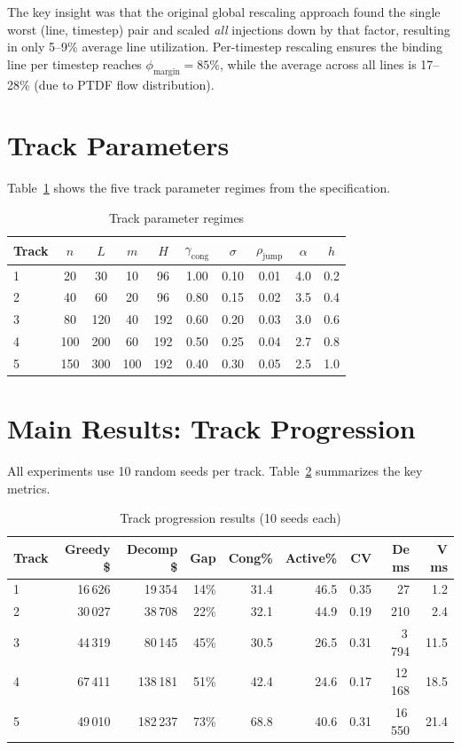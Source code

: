 \documentclass[11pt,a4paper]{article}
\begin{document}
The key insight was that the original global rescaling approach found the single worst (line, timestep) pair and scaled \emph{all} injections down by that factor, resulting in only 5--9\% average line utilization. Per-timestep rescaling ensures the binding line per timestep reaches $\phi_{\mathrm{margin}} = 85\%$, while the average across all lines is 17--28\% (due to PTDF flow distribution).

\section{Track Parameters}

Table~\ref{tab:tracks} shows the five track parameter regimes from the specification.

\begin{table}[h]
\centering
\caption{Track parameter regimes}
\label{tab:tracks}
\begin{tabular}{lccccccccc}
\toprule
\textbf{Track} & $n$ & $L$ & $m$ & $H$ & $\gamma_{\mathrm{cong}}$ & $\sigma$ & $\rho_{\mathrm{jump}}$ & $\alpha$ & $h$ \\
\midrule
1 & 20 & 30 & 10 & 96 & 1.00 & 0.10 & 0.01 & 4.0 & 0.2 \\
2 & 40 & 60 & 20 & 96 & 0.80 & 0.15 & 0.02 & 3.5 & 0.4 \\
3 & 80 & 120 & 40 & 192 & 0.60 & 0.20 & 0.03 & 3.0 & 0.6 \\
4 & 100 & 200 & 60 & 192 & 0.50 & 0.25 & 0.04 & 2.7 & 0.8 \\
5 & 150 & 300 & 100 & 192 & 0.40 & 0.30 & 0.05 & 2.5 & 1.0 \\
\bottomrule
\end{tabular}
\end{table}

\section{Main Results: Track Progression}

All experiments use 10 random seeds per track. Table~\ref{tab:main} summarizes the key metrics.

\begin{table}[h]
\centering
\caption{Track progression results (10 seeds each)}
\label{tab:main}
\begin{tabular}{lrrrrrrrr}
\toprule
\textbf{Track} & \textbf{Greedy \$} & \textbf{Decomp \$} & \textbf{Gap} & \textbf{Cong\%} & \textbf{Active\%} & \textbf{CV} & \textbf{De ms} & \textbf{V ms} \\
\midrule
1 & 16\,626 & 19\,354 & 14\% & 31.4 & 46.5 & 0.35 & 27 & 1.2 \\
2 & 30\,027 & 38\,708 & 22\% & 32.1 & 44.9 & 0.19 & 210 & 2.4 \\
3 & 44\,319 & 80\,145 & 45\% & 30.5 & 26.5 & 0.31 & 3\,794 & 11.5 \\
4 & 67\,411 & 138\,181 & 51\% & 42.4 & 24.6 & 0.17 & 12\,168 & 18.5 \\
5 & 49\,010 & 182\,237 & 73\% & 68.8 & 40.6 & 0.31 & 16\,550 & 21.4 \\
\bottomrule
\end{tabular}
\end{table}
\end{document}

